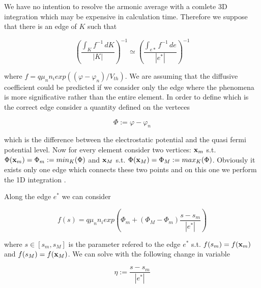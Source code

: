 We have no intention to resolve the armonic average with a comlete 3D integration which may be expensive in calculation time. Therefore we suppose that there is an edge of $K$ such that 

\begin{equation}
\label{eq: approzimation from 3D to edge}
\left(\dfrac{\int_K f^{-1} \, dK}{|K|} \right)^{-1} \simeq \left(\dfrac{\int_{e*} f^{-1} \, de}{|e^*|} \right)^{-1}
\end{equation}
 
 where $f=q \mu_n n_i exp((\varphi-\varphi_n)/V_{th})$.
  We are assuming that the diffusive coefficient could be predicted if we consider only the edge where the phenomena is more significative rather than the entire element. In order to define which is the correct edge consider a quantity defined on the verteces

\begin{equation}
\label{eq: differenza tra pot e qf}
\Phi := \varphi - 	\varphi_n
\end{equation}

which is the difference between the electrostatic potential and the quasi fermi potential level. Now for every element consider two vertices: $\mathbf{x}_m$ s.t. $\Phi(\mathbf{x}_m)=\Phi_m := min_K(\Phi)$ and $\mathbf{x}_M$ s.t. $\Phi(\mathbf{x}_M)=\Phi_M:=max_K(\Phi)$. Obviously it exists only one edge which connects these two points and on this one we perform the 1D integration .



Along the edge $e^*$ we can consider

\begin{equation}
f(s) = q \mu_n n_i exp\left( \Phi_m + (\Phi_M-\Phi_m)\dfrac{s-s_m}{|e^*|} \right)
\end{equation}

where $s \in [s_m,s_M]$ is the parameter refered to the edge $e^*$ s.t. $f(s_m)=f(\mathbf{x}_m)$ and $f(s_M)=f(\mathbf{x}_M)$. We can solve  with the following change in variable

\begin{equation*}
\eta := \dfrac{s-s_m}{|e^*|}
\end{equation*}

